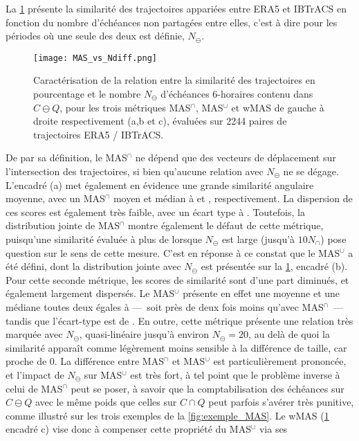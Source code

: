 \documentclass[../main.tex]{subfiles}
\begin{document}
La \cref{fig:MAS_Ndiff} présente la similarité des trajectoires appariées entre ERA5 et IBTrACS en fonction du nombre d'échéances non partagées entre elles,
c'est à dire pour les périodes où une seule des deux est définie, $N_\ominus$.
%
\begin{figure}[htpb]
    \centering
    \texttt{[image: MAS\_vs\_Ndiff.png]}
    \caption{Caractérisation de la relation entre la similarité des trajectoires en pourcentage et le nombre $N_\ominus$ d'échéances \num{6}-horaires contenu
    dans $C \ominus Q$, pour les trois métriques MAS$^\cap$, MAS$^\cup$ et wMAS de gauche à droite respectivement (a,b et c), évaluées sur \num{2244} paires de
    trajectoires ERA5 / IBTrACS.}
    \label{fig:MAS_Ndiff}
\end{figure}
%
De par sa définition, le MAS$^\cap$ ne dépend que des vecteurs de déplacement sur l'intersection des trajectoires, si bien qu'aucune relation avec $N_\ominus$
ne se dégage. L'encadré (a) met également en évidence une grande similarité angulaire moyenne, avec un MAS$^\cap$ moyen et médian à  et ,
respectivement. La dispersion de ces scores est également très faible, avec un écart type à . Toutefois, la distribution jointe de MAS$^\cap$ montre
également le défaut de cette métrique, puisqu'une similarité évaluée à plus de  lorsque $N_\ominus$ est large (jusqu'à $10 N_\cap$) pose question sur
le sens de cette mesure. C'est en réponse à ce constat que le MAS$^\cup$ a été défini, dont la distribution jointe avec $N_\ominus$ est présentée sur la
\cref{fig:MAS_Ndiff}, encadré (b). Pour cette seconde métrique, les scores de similarité sont d'une part diminués, et également largement dispersés. Le
MAS$^\cup$ présente en effet une moyenne et une médiane toutes deux égales à  ---~soit près de deux fois moins qu'avec MAS$^\cap$~--- tandis que
l'écart-type est de . En outre, cette métrique présente une relation très marquée avec $N_\ominus$, quasi-linéaire jusqu'à environ $N_\ominus = 20$, au
delà de quoi la similarité apparaît comme légèrement moins sensible à la différence de taille, car proche de 0. La différence entre MAS$^\cap$ et MAS$^\cup$ est
particulièrement prononcée, et l'impact de $N_\ominus$ sur MAS$^\cup$ est très fort, à tel point que le problème inverse à celui de MAS$^\cap$ peut se poser, à
savoir que la comptabilisation des échéances sur $C \ominus Q$ avec le même poids que celles sur $C \cap Q$ peut parfois s'avérer très punitive, comme illustré
sur les trois exemples de la \cref{fig:exemple_MAS}. Le wMAS (\cref{fig:MAS_Ndiff} encadré c) vise donc à compenser cette propriété du MAS$^\cup$ via ses
\end{document}
